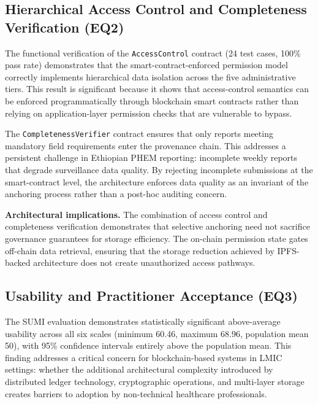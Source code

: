 \documentclass[AMA,LATO1COL]{WileyNJD-v2}
\begin{document}
\subsection{Hierarchical Access Control and Completeness Verification (EQ2)}\label{subsec:disc_access}

The functional verification of the \texttt{AccessControl} contract (24 test cases, 100\% pass rate) demonstrates that the smart-contract-enforced permission model correctly implements hierarchical data isolation across the five administrative tiers. This result is significant because it shows that access-control semantics can be enforced programmatically through blockchain smart contracts rather than relying on application-layer permission checks that are vulnerable to bypass.

The \texttt{CompletenessVerifier} contract ensures that only reports meeting mandatory field requirements enter the provenance chain. This addresses a persistent challenge in Ethiopian PHEM reporting: incomplete weekly reports that degrade surveillance data quality. By rejecting incomplete submissions at the smart-contract level, the architecture enforces data quality as an invariant of the anchoring process rather than a post-hoc auditing concern.

\textbf{Architectural implications.} The combination of access control and completeness verification demonstrates that selective anchoring need not sacrifice governance guarantees for storage efficiency. The on-chain permission state gates off-chain data retrieval, ensuring that the storage reduction achieved by IPFS-backed architecture does not create unauthorized access pathways.

\subsection{Usability and Practitioner Acceptance (EQ3)}\label{subsec:disc_usability}

The SUMI evaluation demonstrates statistically significant above-average usability across all six scales (minimum 60.46, maximum 68.96, population mean 50), with 95\% confidence intervals entirely above the population mean. This finding addresses a critical concern for blockchain-based systems in LMIC settings: whether the additional architectural complexity introduced by distributed ledger technology, cryptographic operations, and multi-layer storage creates barriers to adoption by non-technical healthcare professionals.
\end{document}
